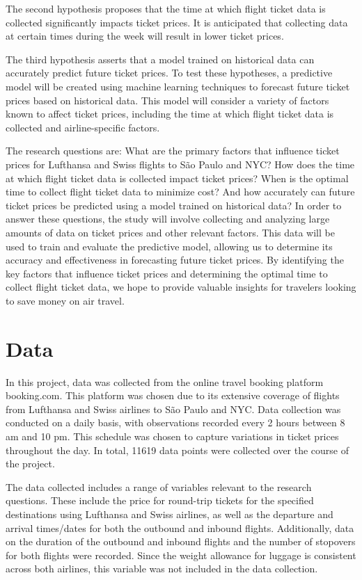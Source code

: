 The second hypothesis proposes that the time at which flight ticket data is collected significantly impacts ticket prices.
It is anticipated that collecting data at certain times during the week will result in lower ticket prices.

The third hypothesis asserts that a model trained on historical data can accurately predict future ticket prices. 
To test these hypotheses, a predictive model will be created using machine learning techniques to forecast future ticket prices based on historical data.
This model will consider a variety of factors known to affect ticket prices, including the time at which flight ticket data is collected and airline-specific factors.

The research questions are: What are the primary factors that influence ticket prices for Lufthansa and Swiss flights to São Paulo and NYC? How does the time at which flight ticket data is collected impact ticket prices? When is the optimal time to collect flight ticket data to minimize cost? And how accurately can future ticket prices be predicted using a model trained on historical data?
In order to answer these questions, the study will involve collecting and analyzing large amounts of data on ticket prices and other relevant factors. This data will be used to train and evaluate the predictive model, allowing us to determine its accuracy and effectiveness in forecasting future ticket prices. By identifying the key factors that influence ticket prices and determining the optimal time to collect flight ticket data, we hope to provide valuable insights for travelers looking to save money on air travel.


\section{Data}
\label{chap:data}
In this project, data was collected from the online travel booking platform booking.com.
This platform was chosen due to its extensive coverage of flights from Lufthansa and Swiss airlines to São Paulo and NYC.
Data collection was conducted on a daily basis, with observations recorded every 2 hours between 8 am and 10 pm.
This schedule was chosen to capture variations in ticket prices throughout the day.
In total, 11619 data points were collected over the course of the project.

The data collected includes a range of variables relevant to the research questions.
These include the price for round-trip tickets for the specified destinations using Lufthansa and Swiss airlines,
as well as the departure and arrival times/dates for both the outbound and inbound flights.
Additionally, data on the duration of the outbound and inbound flights and the number of stopovers for both flights were recorded.
Since the weight allowance for luggage is consistent across both airlines, this variable was not included in the data collection.


